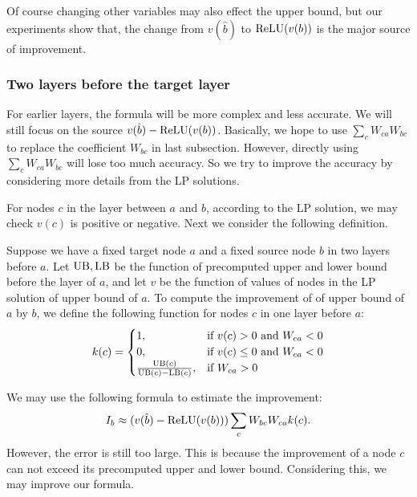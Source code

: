 Of course changing other variables may also effect the upper bound, but our experiments show that, the change from $v(\hat{b})$ to $\mathrm{ReLU}(v(b))$ is the major source of improvement. 




\subsubsection*{Two layers before the target layer}

For earlier layers, the formula will be more complex and less accurate. We will still focus on the source $v(\hat{b})-\mathrm{ReLU}(v(b))$. Basically, we hope to use $\sum_c W_{ca}W_{bc}$ to replace the coefficient $W_{bc}$ in last subsection. However, directly using $\sum_c W_{ca}W_{bc}$ will lose too much accuracy. So we try to improve the accuracy by considering more details from the LP solutions.

For nodes $c$ in the layer between $a$ and $b$, according to the LP solution, we may check $v(c)$ is positive or negative. Next we consider the following definition. 

\begin{definition} \label{2layer}
	Suppose we have a fixed target node $a$ and a fixed source node $b$ in two layers before $a$. Let $\mathrm{UB},\mathrm{LB}$ be the function of precomputed upper and lower bound before the layer of $a$, and let $v$ be the function of values of nodes in the LP solution of upper bound of $a$. 
	To compute the improvement of of upper bound of $a$ by $b$, we define the following function for nodes $c$ in one layer before $a$:
	\begin{align*}
		k(c) =
		\begin{cases}
			1, & \text{if } v(c) > 0 \text{ and } W_{ca} < 0\\
			0, & \text{if } v(c) \leq 0 \text{ and } W_{ca} < 0\\
			\frac{\mathrm{UB}(c)}{\mathrm{UB}(c)-\mathrm{LB}(c)}, & \text{if }W_{ca} > 0
		\end{cases}
	\end{align*} 
\end{definition} 

We may use the following formula to estimate the improvement:  \begin{align*}
	I_b \approx (v(\hat{b})-\mathrm{ReLU}(v(b)))\sum_c W_{bc}W_{ca}k(c).
\end{align*}However, the error is still too large. This is because the improvement of a node $c$ can not exceed its precomputed upper and lower bound. Considering this, we may improve our formula.

